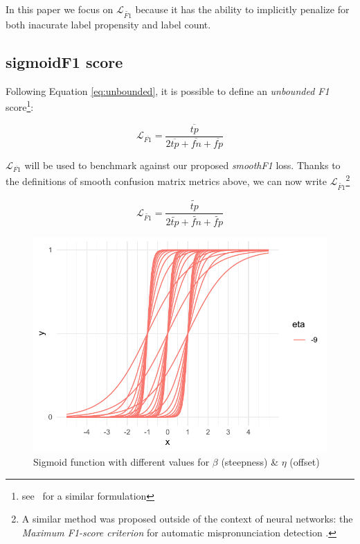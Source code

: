 In this paper we focus on $\mathcal{L}_{\widetilde{\mathit{F1}}}$ because it has the ability to implicitly penalize for both inacurate label propensity and label count.


\subsection{sigmoidF1 score}
\label{sec:orgc5d29d7}

Following Equation \ref{eq:unbounded}, it is possible to define an \emph{unbounded F1} score\footnote{see~\cite{softF1} for a similar formulation}:

\begin{equation}
\mathcal{L}_{\overline{\mathit{F1}}}= \frac{\overline{tp}}{2 \overline{tp}+ \overline{fn}+ \overline{fp}}
\end{equation}

$\mathcal{L}_{\overline{\mathit{F1}}}$ will be used to benchmark against our proposed \emph{smoothF1} loss. Thanks to the definitions of smooth confusion matrix metrics above, we can now write $\mathcal{L}_{\widetilde{\mathit{F1}}}$\footnote{A similar method was proposed outside of the context of neural networks: the \emph{Maximum F1-score criterion} for automatic mispronunciation detection \cite{sigmoid}.}

\begin{equation}\label{eq:sigmoidF1}
\mathcal{L}_{\widetilde{\mathit{F1}}}= \frac{\widetilde{\mathit{tp}}}{2 \widetilde{\mathit{tp}}+ \widetilde{\mathit{fn}}+ \widetilde{\mathit{fp}}}
\end{equation}

\begin{figure}[htbp]
\centering
\includegraphics[width=.9\linewidth]{./images/sigmoid.pdf}
\caption{\label{fig:sigmoid}
Sigmoid function with different values for $\beta$ (steepness) \& $\eta$ (offset)}
\end{figure}

